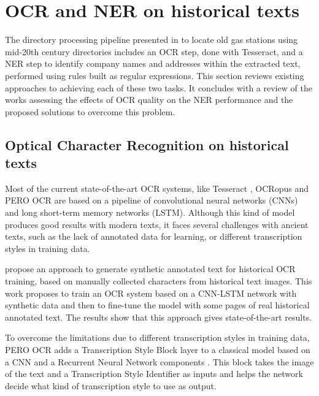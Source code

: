 \section{OCR and NER on historical texts}

The directory processing pipeline presented in \cite{bell2020automated} to locate old gas stations using mid-20th century directories includes an OCR step, done with Tesseract, and a NER step to identify company names and addresses within the extracted text, performed using rules built as regular expressions.
This section reviews existing approaches to achieving each of these two tasks. It concludes with a review of the works assessing the effects of OCR quality on the NER performance and the proposed solutions to overcome this problem. 

\subsection{Optical Character Recognition on historical texts}

Most of the current state-of-the-art OCR systems, like Tesseract \cite{smith2007overview}, OCRopus \cite{breuel2008ocropus} and PERO OCR \cite{kohut2021ts} are based on a pipeline of convolutional neural networks (CNNs) and long short-term memory networks (LSTM).
Although this kind of model produces good results with modern texts, it faces several challenges with ancient texts, such as the lack of annotated data for learning, or different transcription styles in training data.

\cite{martinek2019hybrid} propose an approach to generate synthetic annotated text for historical OCR training, based on manually collected characters from historical text images.
This work proposes to train an OCR system based on a CNN-LSTM network with synthetic data and then to fine-tune the model with some pages of real historical annotated text.
The results show that this approach gives state-of-the-art results. 

To overcome the limitations due to different transcription styles in training data, PERO OCR adds a Transcription Style Block layer to a classical model based on a CNN and a Recurrent Neural Network components \cite{kohut2021ts}.
This block takes the image of the text and a Transcription Style Identifier as inputs and helps the network decide what kind of transcription style to use as output.



